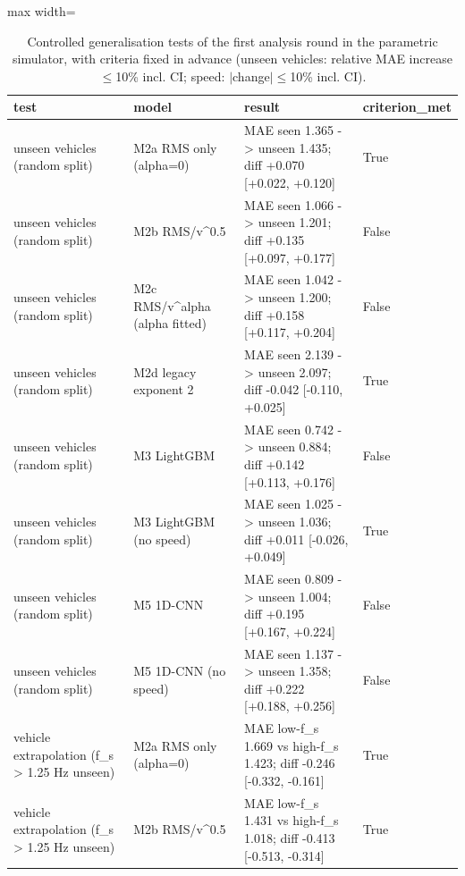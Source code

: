 \begin{table}[!htbp]
\centering
\scriptsize
\caption{Controlled generalisation tests of the first analysis round in the parametric simulator, with criteria fixed in advance (unseen vehicles: relative MAE increase $\le$10\% incl. CI; speed: $|$change$|\le$10\% incl. CI).}
\label{tab:generalisation}
\begin{adjustbox}{max width=\columnwidth}
\begin{tabular}{>{\raggedright\arraybackslash}p{4.3cm}>{\raggedright\arraybackslash}p{4.3cm}>{\raggedright\arraybackslash}p{6.4cm}l}
\toprule
\textbf{test} & \textbf{model} & \textbf{result} & \textbf{criterion\_met} \\
\midrule
unseen vehicles (random split) & M2a RMS only (alpha=0) & MAE seen 1.365 -\textgreater{} unseen 1.435; diff +0.070 [+0.022, +0.120] & True \\
unseen vehicles (random split) & M2b RMS/v\textasciicircum{}0.5 & MAE seen 1.066 -\textgreater{} unseen 1.201; diff +0.135 [+0.097, +0.177] & False \\
unseen vehicles (random split) & M2c RMS/v\textasciicircum{}alpha (alpha fitted) & MAE seen 1.042 -\textgreater{} unseen 1.200; diff +0.158 [+0.117, +0.204] & False \\
unseen vehicles (random split) & M2d legacy exponent 2 & MAE seen 2.139 -\textgreater{} unseen 2.097; diff -0.042 [-0.110, +0.025] & True \\
unseen vehicles (random split) & M3 LightGBM & MAE seen 0.742 -\textgreater{} unseen 0.884; diff +0.142 [+0.113, +0.176] & False \\
unseen vehicles (random split) & M3 LightGBM (no speed) & MAE seen 1.025 -\textgreater{} unseen 1.036; diff +0.011 [-0.026, +0.049] & True \\
unseen vehicles (random split) & M5 1D-CNN & MAE seen 0.809 -\textgreater{} unseen 1.004; diff +0.195 [+0.167, +0.224] & False \\
unseen vehicles (random split) & M5 1D-CNN (no speed) & MAE seen 1.137 -\textgreater{} unseen 1.358; diff +0.222 [+0.188, +0.256] & False \\
vehicle extrapolation (f\_s \textgreater{} 1.25 Hz unseen) & M2a RMS only (alpha=0) & MAE low-f\_s 1.669 vs high-f\_s 1.423; diff -0.246 [-0.332, -0.161] & True \\
vehicle extrapolation (f\_s \textgreater{} 1.25 Hz unseen) & M2b RMS/v\textasciicircum{}0.5 & MAE low-f\_s 1.431 vs high-f\_s 1.018; diff -0.413 [-0.513, -0.314] & True \\

\end{tabular}
\end{adjustbox}
\end{table}
